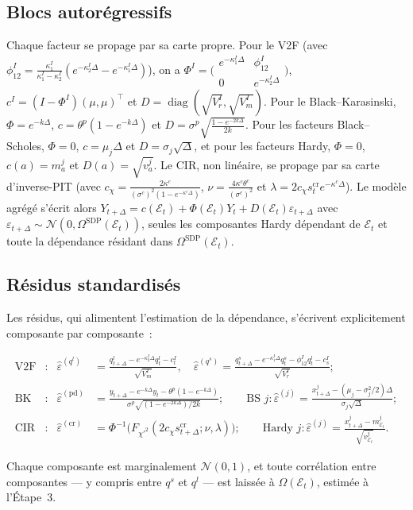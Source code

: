 \documentclass[11pt,a4paper]{article}
\theoremstyle{definition}
\DeclareMathOperator{\diag}{diag}
\newcommand{\Ecal}{\mathcal{E}}
\newcommand{\Ncal}{\mathcal{N}}
\newcommand{\eps}{\varepsilon}
\newcommand{\transp}{^{\!\top}}
\newcommand{\Dt}{\Delta}
\begin{document}
\subsection{Blocs autorégressifs}
Chaque facteur se propage par sa carte propre. Pour le V2F (avec $\phi^I_{12}=\tfrac{\kappa^I_1}{\kappa^I_1-\kappa^I_2}(e^{-\kappa^I_2\Dt}-e^{-\kappa^I_1\Dt})$), on a $\Phi^I=\bigl(\begin{smallmatrix}e^{-\kappa^I_1\Dt}&\phi^I_{12}\\0&e^{-\kappa^I_2\Dt}\end{smallmatrix}\bigr)$, $c^I=(I-\Phi^I)(\mu,\mu)\transp$ et $D=\diag(\sqrt{V^I_r},\sqrt{V^I_m})$. Pour le Black--Karasinski, $\Phi=e^{-k\Dt}$, $c=\theta^p(1-e^{-k\Dt})$ et $D=\sigma^p\sqrt{\tfrac{1-e^{-2k\Dt}}{2k}}$. Pour les facteurs Black--Scholes, $\Phi=0$, $c=\mu_j\Dt$ et $D=\sigma_j\sqrt\Dt$, et pour les facteurs Hardy, $\Phi=0$, $c(a)=m^j_a$ et $D(a)=\sqrt{v^j_a}$. Le CIR, non linéaire, se propage par sa carte d'inverse-PIT (avec $c_\chi=\tfrac{2\kappa^c}{(\sigma^c)^2(1-e^{-\kappa^c\Dt})}$, $\nu=\tfrac{4\kappa^c\theta^c}{(\sigma^c)^2}$ et $\lambda=2c_\chi s^{\mathrm{cr}}_te^{-\kappa^c\Dt}$). Le modèle agrégé s'écrit alors $Y_{t+\Dt}=c(\Ecal_t)+\Phi(\Ecal_t)Y_t+D(\Ecal_t)\eps_{t+\Dt}$ avec $\eps_{t+\Dt}\sim\Ncal(0,\Omega^{\mathrm{SDP}}(\Ecal_t))$, seules les composantes Hardy dépendant de $\Ecal_t$ et toute la dépendance résidant dans $\Omega^{\mathrm{SDP}}(\Ecal_t)$.

\subsection{Résidus standardisés}
\label{sec:residus}
Les résidus, qui alimentent l'estimation de la dépendance, s'écrivent explicitement composante par composante~:
\begin{definitionbox}
\[
\begin{aligned}
\text{V2F}&: &\widehat\eps^{(q^l)}&=\tfrac{q^l_{t+\Dt}-e^{-\kappa^I_2\Dt}q^l_t-c^I_l}{\sqrt{V^I_m}},\quad
\widehat\eps^{(q^s)}=\tfrac{q^s_{t+\Dt}-e^{-\kappa^I_1\Dt}q^s_t-\phi^I_{12}q^l_t-c^I_s}{\sqrt{V^I_r}};\\
\text{BK}&: &\widehat\eps^{(\mathrm{pd})}&=\tfrac{y_{t+\Dt}-e^{-k\Dt}y_t-\theta^p(1-e^{-k\Dt})}{\sigma^p\sqrt{(1-e^{-2k\Dt})/2k}};\qquad
\text{BS } j: \widehat\eps^{(j)}=\tfrac{x^j_{t+\Dt}-(\mu_j-\sigma_j^2/2)\Dt}{\sigma_j\sqrt\Dt};\\
\text{CIR}&: &\widehat\eps^{(\mathrm{cr})}&=\Phi^{-1}\big(F_{\chi'^2}(2c_\chi s^{\mathrm{cr}}_{t+\Dt};\nu,\lambda)\big);\qquad
\text{Hardy } j: \widehat\eps^{(j)}=\tfrac{x^j_{t+\Dt}-m^j_{\Ecal_t}}{\sqrt{v^j_{\Ecal_t}}} .
\end{aligned}
\]
\end{definitionbox}
Chaque composante est marginalement $\Ncal(0,1)$, et toute corrélation entre composantes --- y compris entre $q^s$ et $q^l$ --- est laissée à $\Omega(\Ecal_t)$, estimée à l'Étape~3.
\end{document}
